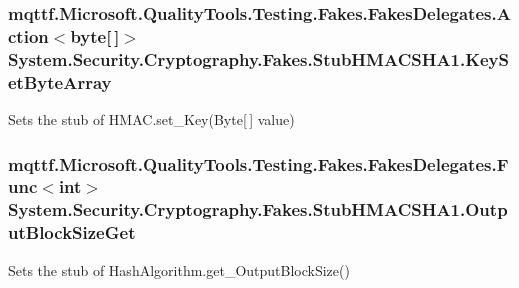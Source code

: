 \hypertarget{class_system_1_1_security_1_1_cryptography_1_1_fakes_1_1_stub_h_m_a_c_s_h_a1_a7864fcbdfd8cc380d2bc3f9e6cdba9fa}{
\subsubsection[{Key\-Set\-Byte\-Array}]{\setlength{\rightskip}{0pt plus 5cm}mqttf.\-Microsoft.\-Quality\-Tools.\-Testing.\-Fakes.\-Fakes\-Delegates.\-Action$<$byte\mbox{[}$\,$\mbox{]}$>$ System.\-Security.\-Cryptography.\-Fakes.\-Stub\-H\-M\-A\-C\-S\-H\-A1.\-Key\-Set\-Byte\-Array}}\label{class_system_1_1_security_1_1_cryptography_1_1_fakes_1_1_stub_h_m_a_c_s_h_a1_a7864fcbdfd8cc380d2bc3f9e6cdba9fa}


Sets the stub of H\-M\-A\-C.\-set\-\_\-\-Key(\-Byte\mbox{[}$\,$\mbox{]} value)

\hypertarget{class_system_1_1_security_1_1_cryptography_1_1_fakes_1_1_stub_h_m_a_c_s_h_a1_a402d47220565af5477d430e6b42f9880}{
\subsubsection[{Output\-Block\-Size\-Get}]{\setlength{\rightskip}{0pt plus 5cm}mqttf.\-Microsoft.\-Quality\-Tools.\-Testing.\-Fakes.\-Fakes\-Delegates.\-Func$<$int$>$ System.\-Security.\-Cryptography.\-Fakes.\-Stub\-H\-M\-A\-C\-S\-H\-A1.\-Output\-Block\-Size\-Get}}\label{class_system_1_1_security_1_1_cryptography_1_1_fakes_1_1_stub_h_m_a_c_s_h_a1_a402d47220565af5477d430e6b42f9880}


Sets the stub of Hash\-Algorithm.\-get\-\_\-\-Output\-Block\-Size()



